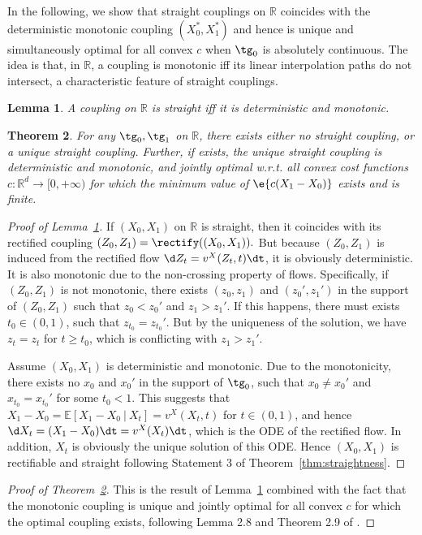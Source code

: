 \documentclass[11pt]{article}
\newtheorem{thm}{Theorem}[section]
\newtheorem{lem}[thm]{Lemma}
\newcommand{\E}{\mathbb{E}}
\newcommand{\RR}{\mathbb{R}}
\begin{document}
In the following, we show that straight couplings on $\RR$ coincides with the deterministic monotonic coupling $(X_0^*, X_1^*)$ and hence is unique and simultaneously optimal for all convex $c$ when $\tg_0$ is absolutely continuous.
The idea is that, in $\RR$, a coupling is monotonic 
iff 
its linear interpolation paths do not intersect, a characteristic feature of straight couplings. 
\begin{lem}\label{thm:monostraightlemma}
A coupling on $\RR$ is  straight iff it is deterministic and monotonic. 
\end{lem} 
\begin{thm}\label{thm:1dstraight} 
For any $\tg_0,\tg_1$ on $\RR$, 
there exists either no straight coupling,
or a unique straight coupling. 
Further, if exists, the unique straight coupling is  deterministic and monotonic,  and jointly optimal w.r.t. all  convex cost functions $c\colon \RR^d\to [0,+\infty)$ 
for which the minimum value of $\e{c(X_1-X_0)}$ exists and is finite.  
\end{thm} 
\begin{proof}[Proof of Lemma~\ref{thm:monostraightlemma}] 
If $(X_0,X_1)$ on $\RR$ is straight, 
then it coincides with its rectified coupling $(Z_0,Z_1) = \rectify((X_0,X_1)).$ 
But because $(Z_0,Z_1)$ is induced from the rectified flow $\d Z_t = v^X(Z_t, t) \dt $, it is obviously deterministic. It is also monotonic due to the non-crossing property of flows.  Specifically, 
if $(Z_0,Z_1)$ is not monotonic, there exists $(z_0,z_1)$ and $(z_0',z_1')$ in the support of $(Z_0,Z_1)$ such that $z_0<z_0'$ and $z_1 > z_1'$. If this happens, there must exists $t_0\in(0,1)$, such that $z_{t_0} = z_{t_0}'$. But by the uniqueness of the solution, we have $z_t=z_t$ for $t\geq t_0$, which is conflicting with $z_1 > z_1'$. 

Assume $(X_0,X_1)$ is deterministic and monotonic. %
Due to the monotonicity, there exists no $x_0$ and $x_0'$ in the support of $\tg_0$, such that $x_0 \neq x_0'$ and $x_{t_0} = x_{t_0}'$ for some $t_0<1$.  This suggests that $X_1-X_0 = \E[X_1-X_0~|~X_t] = v^X(X_t,t)$ for $t\in(0,1)$, and hence  $\d  X_t = (X_1-X_0)\dt = v^X(X_t) \dt $, which is the ODE of the rectified flow. In addition, $X_t$ is obviously the unique solution of this ODE.  Hence $(X_0,X_1)$ is rectifiable and straight following Statement 3 of Theorem~\ref{thm:straightness}.  
\end{proof} 

\begin{proof}[Proof of Theorem~\ref{thm:1dstraight}]
This is the result of Lemma~\ref{thm:monostraightlemma} combined with the fact that the monotonic coupling is unique and jointly optimal for all convex $c$ for which the optimal coupling exists, following 
Lemma 2.8 and 
Theorem 2.9 of \cite{santambrogio2015optimal}. 
\end{proof}
\end{document}

